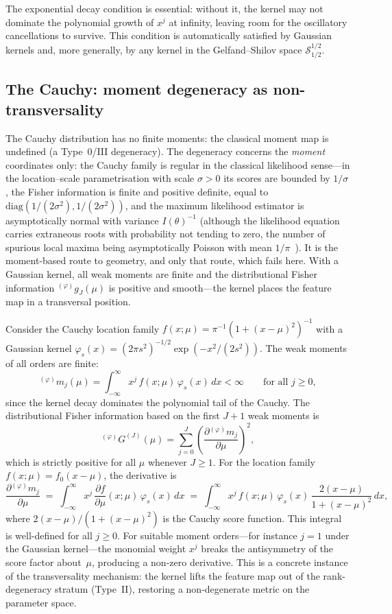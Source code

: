\documentclass[11pt,a4paper]{article}
\newcommand{\wm}[1]{{}^{(\varphi)}\!m_{#1}}
\newcommand{\wg}{{}^{(\varphi)}\!g}
\newcommand{\wG}{{}^{(\varphi)}\!G}
\begin{document}
The exponential decay condition is essential: without it, the kernel
may not dominate the polynomial growth of $x^j$ at infinity,
leaving room for the oscillatory cancellations to survive.  This
condition is automatically satisfied by Gaussian kernels and,
more generally, by any kernel in the Gelfand--Shilov space
$\mathcal{S}^{1/2}_{1/2}$.


\subsection{The Cauchy: moment degeneracy as non-transversality}

The Cauchy distribution has no finite moments: the classical moment
map is undefined (a Type~0/III degeneracy).  The degeneracy concerns
the \emph{moment} coordinates only: the Cauchy family is regular in
the classical likelihood sense---in the location--scale
parametrisation with scale $\sigma>0$ its scores are bounded by
$1/\sigma$, the Fisher information is finite and positive definite,
equal to $\mathrm{diag}(1/(2\sigma^2),1/(2\sigma^2))$, and the
maximum likelihood estimator is
asymptotically normal with variance $I(\theta)^{-1}$ (although the
likelihood equation carries extraneous roots with probability not
tending to zero, the number of spurious local maxima being
asymptotically Poisson with mean $1/\pi$~\cite{Reeds1985}).  It is the
moment-based route to geometry, and only that route, which fails here.  With a Gaussian kernel,
all weak moments are finite and the distributional Fisher information
$\wg_J(\mu)$ is positive and smooth---the kernel places the feature
map in a transversal position.

Consider the Cauchy location family
$f(x;\mu) = \pi^{-1}(1+(x-\mu)^2)^{-1}$ with a Gaussian kernel
$\varphi_s(x) = (2\pi s^2)^{-1/2}\exp(-x^2/(2s^2))$.  The weak
moments of all orders are finite:
\[
  \wm{j}(\mu) = \int_{-\infty}^{\infty}
  x^j\, f(x;\mu)\, \varphi_s(x)\, dx < \infty
  \qquad \text{for all } j\geq 0,
\]
since the kernel decay dominates the polynomial tail of the Cauchy.
The distributional Fisher information based on the first $J+1$ weak
moments is
\[
  \wG^{(J)}(\mu) = \sum_{j=0}^{J}
  \left(\frac{\partial \wm{j}}{\partial \mu}\right)^{\!2},
\]
which is strictly positive for all $\mu$ whenever $J\geq 1$.  For the
location family $f(x;\mu) = f_0(x-\mu)$, the derivative is
\[
  \frac{\partial \wm{j}}{\partial \mu}
  \;=\;
  \int_{-\infty}^{\infty}
  x^j\, \frac{\partial f}{\partial \mu}(x;\mu)\,
  \varphi_s(x)\, dx
  \;=\;
  \int_{-\infty}^{\infty}
  x^j\, f(x;\mu)\,\varphi_s(x)\,
  \frac{2(x-\mu)}{1+(x-\mu)^2}\, dx,
\]
where $2(x-\mu)/(1+(x-\mu)^2)$ is the Cauchy score function.  This
integral is well-defined for all $j \geq 0$.  For suitable moment
orders---for instance $j = 1$ under the Gaussian kernel---the
monomial weight $x^j$ breaks the antisymmetry of the score factor
about~$\mu$, producing a non-zero derivative.
This is a concrete instance of the transversality mechanism: the kernel
lifts the feature map out of the rank-degeneracy stratum (Type~II),
restoring a non-degenerate metric on the parameter space.
\end{document}
